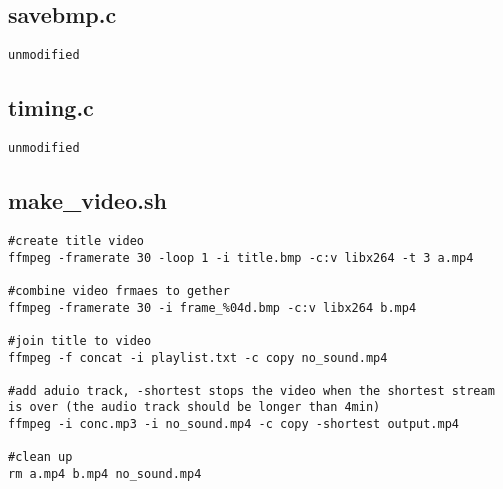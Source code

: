 \documentclass[]{article}
\begin{document}
\subsection{savebmp.c}
\begin{Verbatim}[fontsize= \footnotesize, tabsize=4]
unmodified
\end{Verbatim}

\subsection{timing.c}
\begin{Verbatim}[fontsize= \footnotesize, tabsize=4]
unmodified
\end{Verbatim}

\subsection{make\_video.sh}
\begin{Verbatim}[fontsize= \footnotesize, tabsize=4]
#create title video
ffmpeg -framerate 30 -loop 1 -i title.bmp -c:v libx264 -t 3 a.mp4

#combine video frmaes to gether
ffmpeg -framerate 30 -i frame_%04d.bmp -c:v libx264 b.mp4

#join title to video
ffmpeg -f concat -i playlist.txt -c copy no_sound.mp4

#add aduio track, -shortest stops the video when the shortest stream is over (the audio track should be longer than 4min)
ffmpeg -i conc.mp3 -i no_sound.mp4 -c copy -shortest output.mp4

#clean up
rm a.mp4 b.mp4 no_sound.mp4
\end{Verbatim}
\end{document}
